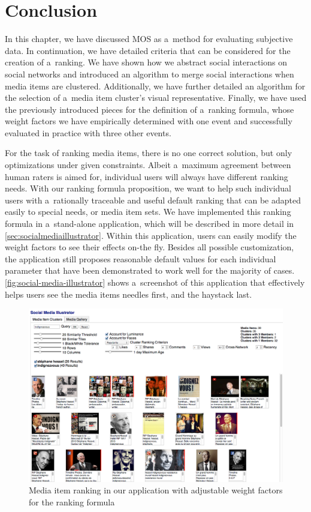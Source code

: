 \section{Conclusion}

In this chapter, we have discussed MOS as a~method
for evaluating subjective data.
In continuation, we have detailed criteria
that can be considered for the creation of a~ranking.
We have shown how we abstract social interactions on social networks
and introduced an algorithm to merge social interactions
when media items are clustered.
Additionally, we have further detailed an algorithm
for the selection of a~media item cluster's visual representative.
Finally, we have used the previously introduced pieces
for the definition of a~ranking formula,
whose weight factors we have empirically determined with one event
and successfully evaluated in practice with three other events.

For the task of ranking media items, there is no one correct solution,
but only optimizations under given constraints.
Albeit a~maximum agreement between human raters is aimed for,
individual users will always have different ranking needs.
With our ranking formula proposition, we want to help
such individual users with a~rationally traceable and useful default ranking
that can be adapted easily to special needs, or media item sets.
We have implemented this ranking formula in a~stand-alone application,%
which will be described in more detail in \autoref{sec:socialmediaillustrator}.
Within this application,
users can easily modify the weight factors
to see their effects on-the fly.
Besides all possible customization,
the application still proposes reasonable default values
for each individual parameter that have been demonstrated
to work well for the majority of cases.
\autoref{fig:social-media-illustrator} shows a~screenshot of this application
that effectively helps users see the media items needles first, and the haystack last.

\begin{figure}[!ht]
  \centering
  \includegraphics[width=1.0\linewidth]{social-media-illustrator.png}
  \caption[Media item ranking in our application with adjustable weight factors]
  {Media item ranking in our application with adjustable weight factors for the ranking formula}
  \label{fig:social-media-illustrator}
\end{figure}


